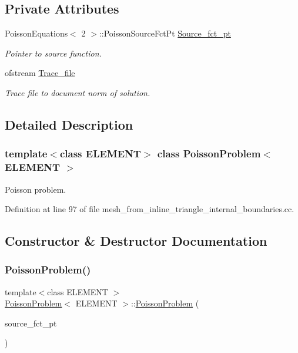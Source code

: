 \subsection*{Private Attributes}
\begin{DoxyCompactItemize}
\item 
Poisson\+Equations$<$ 2 $>$\+::Poisson\+Source\+Fct\+Pt \hyperlink{classPoissonProblem_a2ba5bb705abab012b72bbd7f4016d5fe}{Source\+\_\+fct\+\_\+pt}
\begin{DoxyCompactList}\small\item\em Pointer to source function. \end{DoxyCompactList}\item 
ofstream \hyperlink{classPoissonProblem_a97e7fec0921ca588c6701b56ccf68474}{Trace\+\_\+file}
\begin{DoxyCompactList}\small\item\em Trace file to document norm of solution. \end{DoxyCompactList}\end{DoxyCompactItemize}


\subsection{Detailed Description}
\subsubsection*{template$<$class E\+L\+E\+M\+E\+NT$>$\newline
class Poisson\+Problem$<$ E\+L\+E\+M\+E\+N\+T $>$}

Poisson problem. 

Definition at line 97 of file mesh\+\_\+from\+\_\+inline\+\_\+triangle\+\_\+internal\+\_\+boundaries.\+cc.



\subsection{Constructor \& Destructor Documentation}
\mbox{\label{classPoissonProblem_a9c28346c473d246d8f61022365e742ea}} 
\subsubsection{\texorpdfstring{Poisson\+Problem()}{PoissonProblem()}\hspace{0.1cm}{\footnotesize\ttfamily [1/2]}}
{\footnotesize\ttfamily template$<$class E\+L\+E\+M\+E\+NT $>$ \\
\hyperlink{classPoissonProblem}{Poisson\+Problem}$<$ E\+L\+E\+M\+E\+NT $>$\+::\hyperlink{classPoissonProblem}{Poisson\+Problem} (\begin{DoxyParamCaption}\item[{Poisson\+Equations$<$ 2 $>$\+::Poisson\+Source\+Fct\+Pt}]{source\+\_\+fct\+\_\+pt }\end{DoxyParamCaption})}



